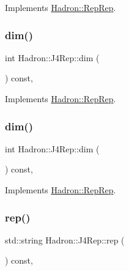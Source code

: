 Implements \mbox{\hyperlink{structHadron_1_1RepRep_a92c8802e5ed7afd7da43ccfd5b7cd92b}{Hadron\+::\+Rep\+Rep}}.

\mbox{\label{structHadron_1_1J4Rep_abd7390e1c86d4543ad991a7167f46615}} 
\subsubsection{\texorpdfstring{dim()}{dim()}\hspace{0.1cm}{\footnotesize\ttfamily [2/3]}}
{\footnotesize\ttfamily int Hadron\+::\+J4\+Rep\+::dim (\begin{DoxyParamCaption}{ }\end{DoxyParamCaption}) const\hspace{0.3cm}{\ttfamily [inline]}, {\ttfamily [virtual]}}



Implements \mbox{\hyperlink{structHadron_1_1RepRep_a92c8802e5ed7afd7da43ccfd5b7cd92b}{Hadron\+::\+Rep\+Rep}}.

\mbox{\label{structHadron_1_1J4Rep_abd7390e1c86d4543ad991a7167f46615}} 
\subsubsection{\texorpdfstring{dim()}{dim()}\hspace{0.1cm}{\footnotesize\ttfamily [3/3]}}
{\footnotesize\ttfamily int Hadron\+::\+J4\+Rep\+::dim (\begin{DoxyParamCaption}{ }\end{DoxyParamCaption}) const\hspace{0.3cm}{\ttfamily [inline]}, {\ttfamily [virtual]}}



Implements \mbox{\hyperlink{structHadron_1_1RepRep_a92c8802e5ed7afd7da43ccfd5b7cd92b}{Hadron\+::\+Rep\+Rep}}.

\mbox{\label{structHadron_1_1J4Rep_a2dcdb2a04a0f8207e99fffb770037b9e}} 
\subsubsection{\texorpdfstring{rep()}{rep()}\hspace{0.1cm}{\footnotesize\ttfamily [1/3]}}
{\footnotesize\ttfamily std\+::string Hadron\+::\+J4\+Rep\+::rep (\begin{DoxyParamCaption}{ }\end{DoxyParamCaption}) const\hspace{0.3cm}{\ttfamily [inline]}, {\ttfamily [virtual]}}



